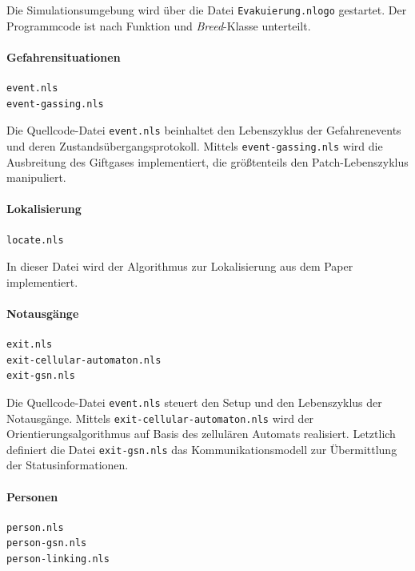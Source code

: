 Die Simulationsumgebung wird über die Datei \verb|Evakuierung.nlogo| gestartet. Der Programmcode ist nach Funktion und \emph{Breed}-Klasse unterteilt.

\paragraph{Gefahrensituationen} 

\begin{verbatim}
event.nls
event-gassing.nls
\end{verbatim}

Die Quellcode-Datei \verb|event.nls| beinhaltet den Lebenszyklus der Gefahrenevents und deren Zustandsübergangsprotokoll. Mittels \verb|event-gassing.nls| wird die Ausbreitung des Giftgases implementiert, die größtenteils den Patch-Lebenszyklus manipuliert.

\paragraph{Lokalisierung}

\begin{verbatim}
locate.nls
\end{verbatim}

In dieser Datei wird der Algorithmus zur Lokalisierung aus dem Paper \cite{Jonathan.2004} implementiert.

\paragraph{Notausgänge}

\begin{verbatim}
exit.nls
exit-cellular-automaton.nls
exit-gsn.nls
\end{verbatim}

Die Quellcode-Datei \verb|event.nls| steuert den Setup und den Lebenszyklus der Notausgänge. Mittels \verb|exit-cellular-automaton.nls| wird der Orientierungsalgorithmus auf Basis des zellulären Automats realisiert. Letztlich definiert die Datei \verb|exit-gsn.nls| das Kommunikationsmodell zur Übermittlung der Statusinformationen.

\paragraph{Personen}

\begin{verbatim}
person.nls
person-gsn.nls
person-linking.nls
\end{verbatim}

